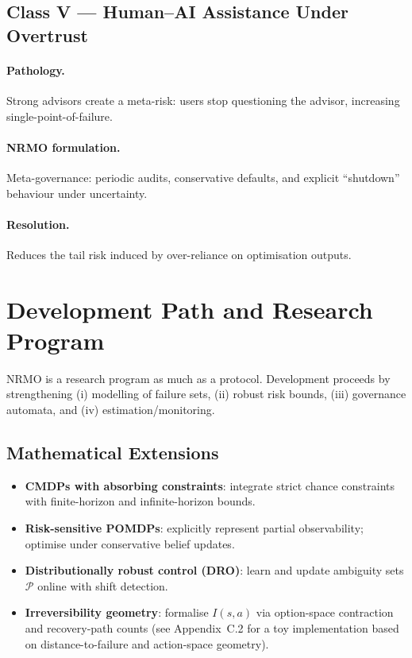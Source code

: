 \subsection{Class V --- Human--AI Assistance Under Overtrust}
\label{sec:foundations-7-5-class-V}

\paragraph{Pathology.}
Strong advisors create a meta-risk: users stop questioning the
advisor, increasing single-point-of-failure.

\paragraph{NRMO formulation.}
Meta-governance: periodic audits, conservative defaults, and
explicit ``shutdown'' behaviour under uncertainty.

\paragraph{Resolution.}
Reduces the tail risk induced by over-reliance on optimisation
outputs.

\section{Development Path and Research Program}
\label{sec:foundations-8-development-path}

NRMO is a research program as much as a protocol. Development
proceeds by strengthening (i) modelling of failure sets, (ii) robust
risk bounds, (iii) governance automata, and (iv)
estimation/monitoring.

\subsection{Mathematical Extensions}
\label{sec:foundations-8-1-math-extensions}

\begin{itemize}
\item \textbf{CMDPs with absorbing constraints}: integrate strict
chance constraints with finite-horizon and infinite-horizon bounds.
\item \textbf{Risk-sensitive POMDPs}: explicitly represent partial
observability; optimise under conservative belief updates.
\item \textbf{Distributionally robust control (DRO)}: learn and
update ambiguity sets $\mathcal{P}$ online with shift detection.
\item \textbf{Irreversibility geometry}: formalise $I(s, a)$ via
option-space contraction and recovery-path counts (see
Appendix~C.2 for a toy implementation based on
distance-to-failure and action-space geometry).
\end{itemize}

